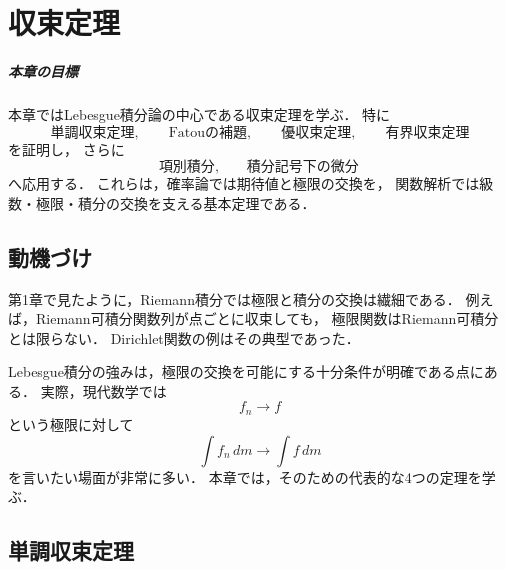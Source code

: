 \chapter{収束定理}

\paragraph{本章の目標}
本章ではLebesgue積分論の中心である収束定理を学ぶ．
特に
\[
\text{単調収束定理},\qquad
\text{Fatouの補題},\qquad
\text{優収束定理},\qquad
\text{有界収束定理}
\]
を証明し，
さらに
\[
\text{項別積分},\qquad \text{積分記号下の微分}
\]
へ応用する．
これらは，確率論では期待値と極限の交換を，
関数解析では級数・極限・積分の交換を支える基本定理である．

\section{動機づけ}

第1章で見たように，Riemann積分では極限と積分の交換は繊細である．
例えば，Riemann可積分関数列が点ごとに収束しても，
極限関数はRiemann可積分とは限らない．
Dirichlet関数の例はその典型であった．

Lebesgue積分の強みは，極限の交換を可能にする十分条件が明確である点にある．
実際，現代数学では
\[
f_n \to f
\]
という極限に対して
\[
\int f_n\,dm \to \int f\,dm
\]
を言いたい場面が非常に多い．
本章では，そのための代表的な4つの定理を学ぶ．

\section{単調収束定理}

